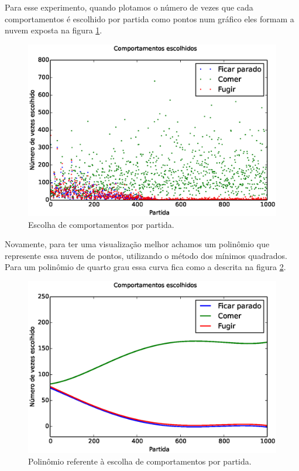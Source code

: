 Para esse experimento, quando plotamos o número de vezes que cada comportamentos é escolhido por partida como pontos num gráfico eles formam a nuvem exposta na figura \ref{img:3ComportamentosMapaOriginal:ComportamentosEscolhidos}.

\begin{figure}[H]
    \centering
    \includegraphics[width=\linewidth]{images/3_behaviors_original_map/chosen_behaviors}
    \caption{Escolha de comportamentos por partida.}
    \label{img:3ComportamentosMapaOriginal:ComportamentosEscolhidos}
\end{figure}

Novamente, para ter uma visualização melhor achamos um polinômio que represente essa nuvem de pontos, utilizando o método dos mínimos quadrados. Para um polinômio de quarto grau essa curva fica como a descrita na figura \ref{img:3ComportamentosMapaOriginal:ComportamentosEscolhidosPolinômio}.

\begin{figure}[H]
    \centering
    \includegraphics[width=\linewidth]{images/3_behaviors_original_map/chosen_behaviors_pol}
    \caption{Polinômio referente à escolha de comportamentos por partida.}
    \label{img:3ComportamentosMapaOriginal:ComportamentosEscolhidosPolinômio}
\end{figure}

